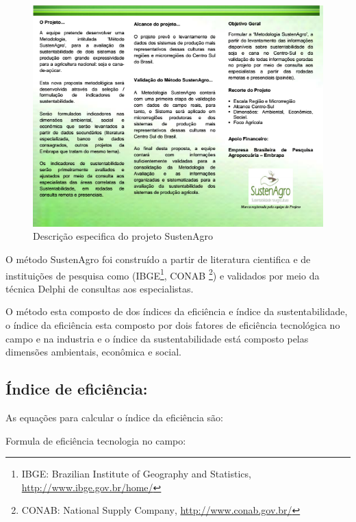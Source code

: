 \begin{figure}[H]
\begin{centering}
\includegraphics[width=1\columnwidth]{figures/folderEmbrapa2}
\par\end{centering}
\caption{Descrição especifica do projeto SustenAgro \label{fig:SustenAgro_Details}}
\end{figure}

O método SustenAgro foi construído a partir de literatura cientifica
e de instituições de pesquisa como (IBGE\footnote{IBGE: \foreignlanguage{english}{Brazilian Institute of Geography and
Statistics}, \url{http://www.ibge.gov.br/home/}}, CONAB \footnote{CONAB: \foreignlanguage{english}{National Supply Company}, \url{http://www.conab.gov.br/}})
e validados por meio da técnica \foreignlanguage{english}{Delphi}
de consultas aos especialistas.

O método esta composto de dos índices da eficiência e índice da sustentabilidade,
o índice da eficiência esta composto por dois fatores de eficiência
tecnológica no campo e na industria e o índice da sustentabilidade
está composto pelas dimensões ambientais, econômica e social.

\subsection*{Índice de eficiência:}

As equações para calcular o índice da eficiência são:

Formula de eficiência tecnologia no campo:

